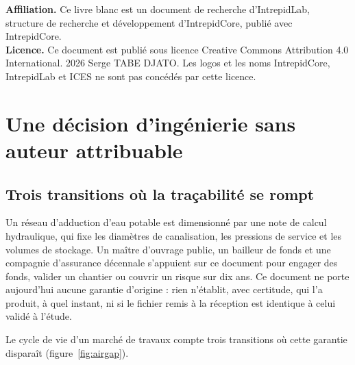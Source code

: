 \documentclass[11pt,a4paper]{article}
\begin{document}
{\small\textbf{Affiliation.} Ce livre blanc est un document de recherche d'IntrepidLab, structure de recherche et développement d'IntrepidCore, publié avec IntrepidCore.\\
\textbf{Licence.} Ce document est publié sous licence Creative Commons Attribution 4.0 International. \textcopyright{} 2026 Serge TABE DJATO. Les logos et les noms IntrepidCore, IntrepidLab et ICES ne sont pas concédés par cette licence.}
\newpage

\tableofcontents
\newpage
\listoffigures
\newpage
\listoftables
\newpage
{}
\pagestyle{corps}


\section{Une décision d'ingénierie sans auteur attribuable}\label{sec:intro}

\subsection{Trois transitions où la traçabilité se rompt}

Un réseau d'adduction d'eau potable est dimensionné par une note de calcul hydraulique, qui fixe les diamètres de canalisation, les pressions de service et les volumes de stockage. Un maître d'ouvrage public, un bailleur de fonds et une compagnie d'assurance décennale s'appuient sur ce document pour engager des fonds, valider un chantier ou couvrir un risque sur dix ans. Ce document ne porte aujourd'hui aucune garantie d'origine : rien n'établit, avec certitude, qui l'a produit, à quel instant, ni si le fichier remis à la réception est identique à celui validé à l'étude.

Le cycle de vie d'un marché de travaux compte trois transitions où cette garantie disparaît (figure~\ref{fig:airgap}).
\end{document}
